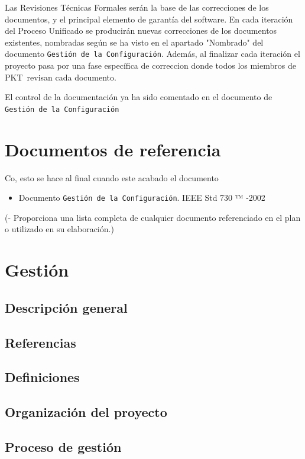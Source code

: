 \documentclass[spanish,a4paper,11pt, twoside]{report}	%
\newcommand*{\PKT}{\hbox{P}\kern-2.5pt\lower3.5pt\hbox{\small{K}}\kern-2.8pt\hbox{T}\kern-2pt}	%
\begin{document}
Las Revisiones Técnicas Formales serán la base de las correcciones de los documentos, y el principal elemento de garantía del software. En cada iteración del Proceso Unificado se producirán nuevas correcciones de los documentos existentes, nombradas según se ha visto en el apartado "Nombrado" del documento \texttt{Gestión de la Configuración}. Además, al finalizar cada iteración el proyecto pasa por una fase específica de correccion donde todos los miembros de  \PKT \ revisan cada documento.

El control de la documentación ya ha sido comentado en el documento de \texttt{Gestión de la Configuración}	

\newpage
\mbox{}
\thispagestyle{empty}						%
\newpage

\chapter{ Documentos de referencia}
	Co, esto se hace al final cuando este acabado el documento
\begin{itemize}
	\item Documento \texttt{Gestión de la Configuración}.
IEEE Std 730 ™ -2002
	
\end{itemize}	
	(- Proporciona una lista completa de cualquier documento referenciado en el plan o utilizado en su elaboración.)

\newpage
\mbox{}
\thispagestyle{empty}						%
\newpage

\chapter{ Gestión}%
	\section{ Descripción general}
	\section{ Referencias}
	\section{ Definiciones}
	\section{Organización del proyecto}
	\section{ Proceso de gestión}
\end{document}
